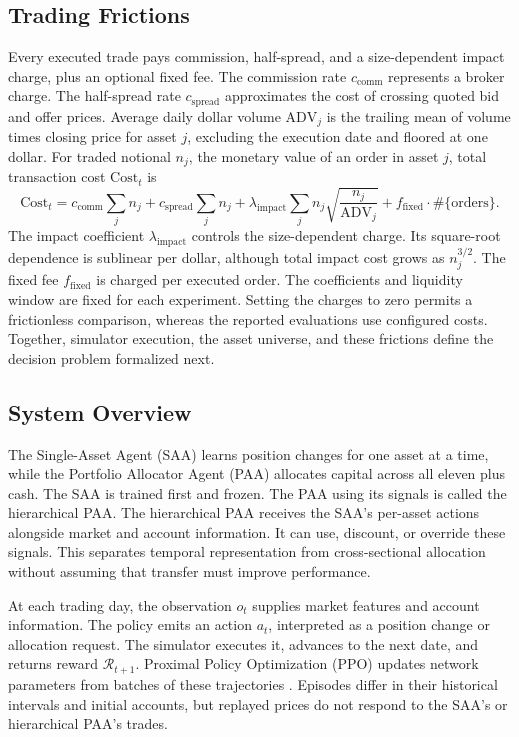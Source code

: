 \subsection{Trading Frictions}
\label{sec:friction}

Every executed trade pays commission, half-spread, and a size-dependent impact charge, plus an optional fixed fee. The commission rate \(c_{\text{comm}}\) represents a broker charge. The half-spread rate \(c_{\text{spread}}\) approximates the cost of crossing quoted bid and offer prices. Average daily dollar volume \(\mathrm{ADV}_j\) is the trailing mean of volume times closing price for asset \(j\), excluding the execution date and floored at one dollar. For traded notional \(n_j\), the monetary value of an order in asset \(j\), total transaction cost \(\mathrm{Cost}_t\) is
\begin{equation}
\text{Cost}_t = c_{\text{comm}}\sum_j n_j + c_{\text{spread}}\sum_j n_j
+ \lambda_{\text{impact}}\sum_j n_j\sqrt{\frac{n_j}{\text{ADV}_j}}
+ f_{\text{fixed}}\cdot\#\{\text{orders}\}.
\label{eq:trading-cost}
\end{equation}
The impact coefficient \(\lambda_{\text{impact}}\) controls the size-dependent charge. Its square-root dependence is sublinear per dollar, although total impact cost grows as \(n_j^{3/2}\). The fixed fee \(f_{\text{fixed}}\) is charged per executed order. The coefficients and liquidity window are fixed for each experiment. Setting the charges to zero permits a frictionless comparison, whereas the reported evaluations use configured costs. Together, simulator execution, the asset universe, and these frictions define the decision problem formalized next.

\subsection{System Overview}
\label{sec:overview}

The Single-Asset Agent (SAA) learns position changes for one asset at a time, while the Portfolio Allocator Agent (PAA) allocates capital across all eleven plus cash. The SAA is trained first and frozen. The PAA using its signals is called the hierarchical PAA. The hierarchical PAA receives the SAA's per-asset actions alongside market and account information. It can use, discount, or override these signals. This separates temporal representation from cross-sectional allocation without assuming that transfer must improve performance.

At each trading day, the observation \(o_t\) supplies market features and account information. The policy emits an action \(a_t\), interpreted as a position change or allocation request. The simulator executes it, advances to the next date, and returns reward \(\mathcal R_{t+1}\). Proximal Policy Optimization (PPO) updates network parameters from batches of these trajectories \cite{JohnSchulmanFilipWolskiPrafullaDhariwalAlecRadfordOlegKlimov.2017}. Episodes differ in their historical intervals and initial accounts, but replayed prices do not respond to the SAA's or hierarchical PAA's trades.

